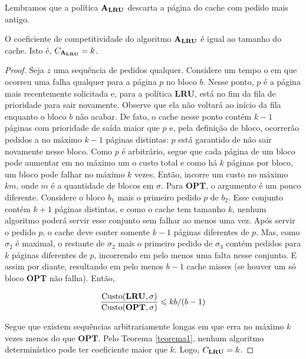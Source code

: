 Lembramos que a política \(\mathbf{A_{LRU}}\) descarta a página do cache com pedido mais antigo. 

\begin{theorem}
  O coeficiente de competitividade do algoritmo \(\mathbf{A_{LRU}}\) é igual ao tamanho do cache. Isto é, \(C_{\mathbf{A_{LRU}}} = k\).
\end{theorem}

\begin{proof}
  Seja \(z\) uma sequência de pedidos qualquer. Considere um tempo o em que ocorreu uma falha qualquer para a página \(p\) no bloco \(b\).
  Nesse ponto, \(p\) é a página mais recentemente solicitada e, para a política \textbf{LRU}, está no fim da fila de prioridade para sair novamente. Observe que ela não voltará ao início da fila enquanto o bloco \(b\) não acabar. De fato, o cache nesse ponto contém \(k-1\) páginas com prioridade de saída maior que \(p\) e, pela definição de bloco, ocorrerão pedidos a no máximo \(k-1\) páginas distintas: \(p\) está garantido de não sair novamente nesse bloco. Como \(p\) é arbitrário, segue que cada página de um bloco pode aumentar em no máximo um o custo total e como há \(k\) páginas por bloco, um bloco pode falhar no máximo \(k\) vezes. Então,  incorre um custo no máximo \(km\), onde \(m\) é a quantidade de blocos em \(\sigma\). Para \textbf{OPT}, o argumento é um pouco diferente. Considere o bloco \(b_1\) mais o primeiro pedido \(p\) de \(b_2\). Esse conjunto contém \(k+1\) páginas distintas, e como o cache tem tamanho \(k\), nenhum algoritmo poderá servir esse conjunto sem falhar ao menos uma vez. Após servir o pedido \(p\), o cache deve conter somente \(k-1\) páginas diferentes de \(p\). Mas, como \(\sigma_2\) é maximal, o restante de \(\sigma_2\) mais o primeiro pedido de \(\sigma_3\) contém pedidos para \(k\) páginas diferentes de \(p\), incorrendo em pelo menos uma falta nesse conjunto. E assim por diante, resultando em pelo menos \(b - 1\) cache misses (se houver um só bloco \textbf{OPT} não falha). Então, 

  \begin{equation*}
    \frac{\text{Custo}(\bold{LRU}, \sigma)}{\text{Custo}(\bold{OPT}, \sigma)} \leqslant kb/(b-1)
  \end{equation*}

  Segue que existem sequências arbitrariamente longas em que  erra no máximo \(k\) vezes menos do que \textbf{OPT}. Pelo Teorema \ref{teorema1}, nenhum algoritmo determinístico pode ter coeficiente maior que \(k\). Logo, \(C_{\bold{LRU}} = k\).
\end{proof}

